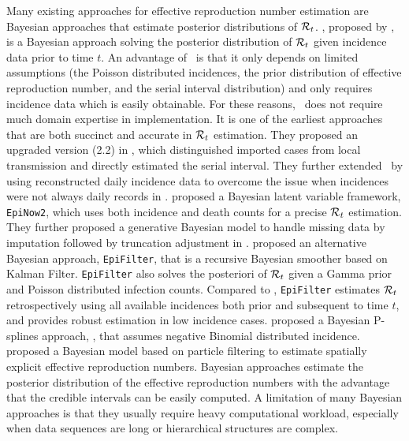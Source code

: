 Many existing approaches for effective reproduction number estimation are Bayesian approaches that estimate posterior distributions of $\mathcal{R}_t$. \EpiEstim, proposed by \cite{cori2013new}, is a Bayesian approach solving the posterior distribution of $\mathcal{R}_t$ given incidence data prior to time $t$. An advantage of \EpiEstim\ is that it only depends on limited assumptions (the Poisson distributed incidences, the prior distribution of effective reproduction number, and the serial interval distribution) and only requires incidence data which is easily obtainable. For these reasons, \EpiEstim\ does not require much domain expertise in implementation. It is one of the earliest approaches that are both succinct and accurate in $\mathcal{R}_t$ estimation. They proposed an upgraded version \EpiEstim(2.2) in \cite{thompson2019improved}, which distinguished imported cases from local transmission and directly estimated the serial interval. They further extended \EpiEstim\ by using reconstructed daily incidence data to overcome the issue when incidences were not always daily records in \cite{nash2023estimating}. 
% 
\cite{abbott2020estimating} proposed a Bayesian latent variable framework, \texttt{EpiNow2}, which uses both incidence and death counts for a precise $\mathcal{R}_t$ estimation. They further proposed a generative Bayesian model to handle missing data by imputation followed by truncation adjustment in \cite{lison2023generative}. 
%
\cite{parag2021improved} proposed an alternative Bayesian approach, \texttt{EpiFilter}, that is a recursive Bayesian smoother based on Kalman Filter. \texttt{EpiFilter} also solves the posteriori of $\mathcal{R}_t$ given a Gamma prior and Poisson distributed infection counts. Compared to \EpiEstim, \texttt{EpiFilter} estimates $\mathcal{R}_t$ retrospectively using all available incidences both prior and subsequent to time $t$, and provides robust estimation in low incidence cases.  
\cite{gressani2022epilps} proposed a Bayesian P-splines approach, \EpiLPS, that assumes negative Binomial distributed incidence. 
\cite{trevisin2023spatially} proposed a Bayesian model based on particle filtering to estimate spatially explicit effective reproduction numbers.
%
Bayesian approaches estimate the posterior distribution of the effective reproduction numbers with the advantage that the credible intervals can be easily computed. A limitation of many Bayesian approaches is that they usually require heavy computational workload, especially when data sequences are long or hierarchical structures are complex.  %

